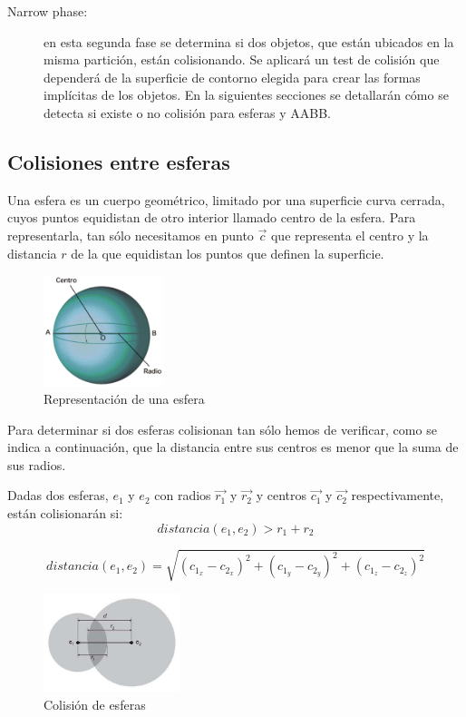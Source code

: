 \begin{description}
\item [Narrow phase:] en esta segunda fase se determina si dos objetos, que están ubicados en la misma partición, están colisionando. Se aplicará un test de colisión que dependerá de la superficie de contorno elegida para crear las formas implícitas de los objetos. En la siguientes secciones se detallarán cómo se detecta si existe o no colisión para esferas y AABB.
\end{description}

\subsection{Colisiones entre esferas}

Una esfera es un cuerpo geométrico, limitado por una superficie curva cerrada, cuyos puntos equidistan de otro interior llamado centro de la esfera. Para representarla, tan sólo necesitamos en  punto $\vec{c}$ que representa el centro y la distancia $r$ de la que equidistan los puntos que definen la superficie.
\newline 

\begin{figure}[h]
	\centering	
         \includegraphics[width=3.5cm]{img/esfera.png}
	\caption{Representación de una esfera}
\end{figure}

Para determinar si dos esferas colisionan tan sólo hemos de verificar, como se indica a continuación, que la distancia entre sus centros es menor que la suma de sus radios.
\newline

Dadas dos esferas, $e_1$ y $e_2$ con radios $\vec{r_1}$ y $\vec{r_2}$ y centros $\vec{c_1}$ y $\vec{c_2}$ respectivamente, están colisionarán si:
$$ distancia ( e_1, e_2 ) > r_1 + r_2 $$

$$ distancia ( e_1, e_2 ) =  \sqrt{ (c_{1_x} - c_{2_x} )^2  + (c_{1_y} - c_{2_y})^2  + (c_{1_z} - c_{2_z} )^2  } $$

\begin{figure}[h]
	\centering	
         \includegraphics[width=4cm]{img/SphereSphereCollision.jpg}
	\caption{Colisión de esferas}
\end{figure}

